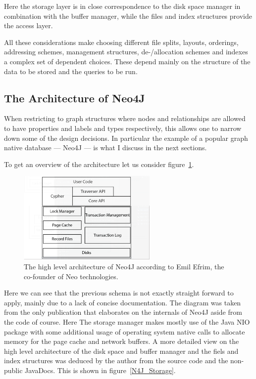 \documentclass[a4paper,10pt]{article}
\begin{document}
Here the storage layer is in close correspondence to the disk space manager in combination with the buffer manager, while the files and index structures provide the access layer.

All these considerations make choosing different file splits, layouts, orderings, addressing schemes, management structures, de-/allocation schemes and indexes a complex set of dependent choices. 
These depend mainly on the structure of the data to be stored and the queries to be run. 

\subsection{The Architecture of Neo4J}
When restricting to graph structures where nodes and relationships are allowed to have properties and labels and types respectively, this allows one to narrow down some of the design decisions. In particular the example of a popular graph native database --- Neo4J --- is what I discuss in the next sections. 

To get an overview of the architecture let us consider figure~\ref{N4J_HLA_Emil}. 

\begin{figure}[htp]\label{N4J_HLA_Emil}
 \begin{center}
  \includegraphics[keepaspectratio,width=0.6\textwidth]{img/00_intro/N4J_HLA_Emil.png}
 \end{center}
 \caption{The high level architecture of Neo4J according to Emil Efrim, the co-founder of Neo technologies.} %
\end{figure}

Here we can see that the previous schema is not exactly straight forward to apply, mainly due to a lack of concise documentation. The diagram was taken from the only publication that elaborates on the internals of Neo4J aside from the code of course. Here The storage manager makes mostly use of the Java NIO package with some additional usage of operating system native calls to allocate memory for the page cache and network buffers. 
A more detailed view on the high level architecture of the disk space and buffer manager and the fiels and index structures was deduced by the author from the source code and the non-public JavaDocs. This is shown in figure~\ref{N4J_Storage}.
\end{document}
